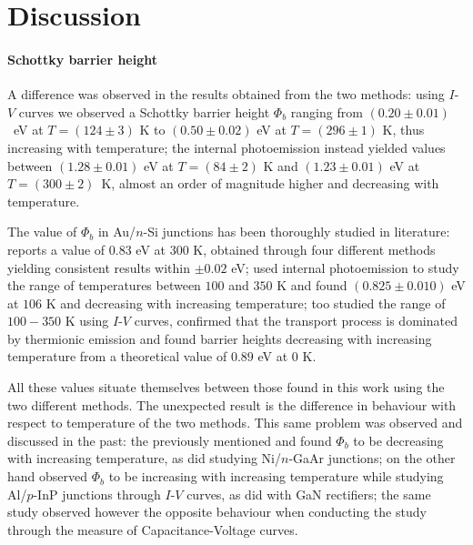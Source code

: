 \newpage %

\section{Discussion}
\paragraph{Schottky barrier height} A difference was observed in the results obtained from the two me\-thods:
using $I$-$V$ curves we observed a Schottky barrier height $\Phi_b$ ranging from \mbox{$(0.20 \pm 0.01)$ eV} at $T = (124 \pm 3)$ K to $(0.50 \pm 0.02)$ eV at $T = (296 \pm 1)$ K, thus increasing with temperature; 
the internal photoemission instead yielded values between $(1.28 \pm 0.01)$ eV at $T = (84 \pm 2)$ K and $(1.23 \pm 0.01)$ eV at \mbox{$T = (300 \pm 2)$ K}, almost an order of magnitude higher and decreasing with temperature.

The value of $\Phi_b$ in Au/$n$-Si junctions has been thoroughly studied in literature: 
\cite{sze_physics_2007} reports a value of $0.83$ eV at 300 K, obtained through four different methods yielding consistent results within $\pm 0.02$ eV; 
\cite{crowell_equality_1964} used internal photoemission to study the range of temperatures between $100$ and $350$ K and found $(0.825 \pm 0.010)$ eV at $106$ K and decreasing with increasing temperature; 
\cite{arizumi_transport_1969} too studied the range {of} $100-350$ K using $I$-$V$ curves, confirmed that the transport process is dominated by thermionic emission and found barrier heights decreasing with increasing temperature from a theoretical value of $0.89$ eV at $0$ K.

All these values situate themselves between those found in this work using the two different methods. {The unexpected result} is the difference in behaviour with respect to temperature of the two methods.
This same problem was observed and discussed in the past:
the previously mentioned \cite{crowell_equality_1964} and \cite{arizumi_transport_1969} found $\Phi_b$ to be decreasing with increasing temperature, as did \cite{hackam_electrical_1972} studying Ni/$n$-GaAr junctions;
\cite{yildirim_temperature-dependent_2010} on the other hand observed $\Phi_b$ to be increasing with increasing temperature while studying Al/$p$-InP junctions through $I$-$V$ curves, as did \cite{zhou_temperature-dependent_2007} with GaN rectifiers; the same study observed however the opposite behaviour when conducting the study through the measure of Capacitance-Voltage curves.


